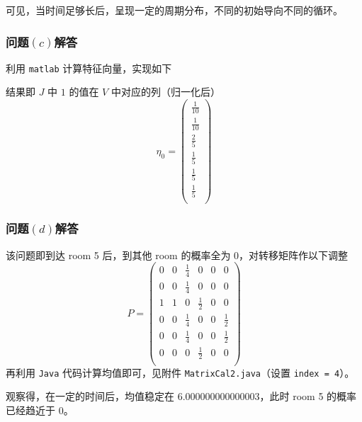 \documentclass[12pt,a4paper]{article}%
\begin{document}
    可见，当时间足够长后，呈现一定的周期分布，不同的初始导向不同的循环。

\subsubsection{问题$\left(c\right)$解答}
利用 \texttt{matlab} 计算特征向量，实现如下

结果即 \(J\) 中 \(1\) 的值在 \(V\) 中对应的列（归一化后）
\begin{equation*}
    \eta_0 = \left( \begin{matrix*}
                        \frac{1}{10} \\
                        \frac{1}{10} \\
                        \frac{2}{5}  \\
                        \frac{1}{5}  \\
                        \frac{1}{5}  \\
                        \frac{1}{5}  \\
    \end{matrix*} \right)
\end{equation*}

\subsubsection{问题$\left(d\right)$解答}
该问题即到达 room 5 后，到其他 room 的概率全为 0，对转移矩阵作以下调整
\begin{equation*}
    P = \left( \begin{matrix*}
                   0 & 0 & \frac{1}{4} & 0           & 0 & 0 \\
                   0 & 0 & \frac{1}{4} & 0           & 0 & 0 \\
                   1 & 1 & 0           & \frac{1}{2} & 0 & 0 \\
                   0 & 0 & \frac{1}{4} & 0           & 0 & \frac{1}{2} \\
                   0 & 0 & \frac{1}{4} & 0           & 0 & \frac{1}{2} \\
                   0 & 0 & 0           & \frac{1}{2} & 0 & 0 \\
    \end{matrix*} \right)
\end{equation*}
再利用 \texttt{Java} 代码计算均值即可，见附件 \texttt{MatrixCal2.java}（设置 \texttt{index = 4}）。

观察得，在一定的时间后，均值稳定在 6.000000000000003，此时 room 5 的概率已经趋近于 0。
\end{document}

